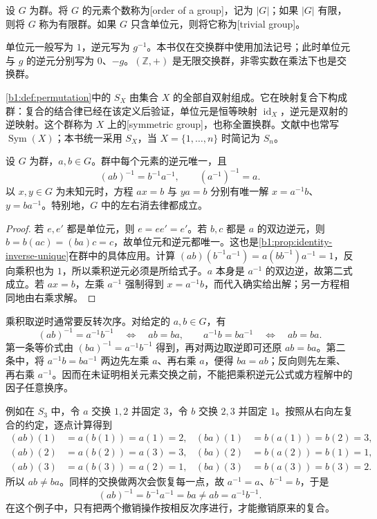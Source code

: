\ProseParagraphBreak
设 \(G\) 为群。将 \(G\) 的元素个数称为[order of a group]，记为 \(\lvert G\rvert\)；如果 \(|G|\) 有限，则将 \(G\) 称为有限群。如果 \(G\) 只含单位元，则将它称为[trivial group]。

\ProseParagraphBreak
单位元一般写为 \(1\)，逆元写为 \(g^{-1}\)。本书仅在交换群中使用加法记号；此时单位元与 \(g\) 的逆元分别写为 \(0\)、\(-g\)。\((\mathbb Z,+)\) 是无限交换群，非零实数在乘法下也是交换群。

\ProseParagraphBreak
\cref{b1:def:permutation}中的 \(S_X\) 由集合 \(X\) 的全部自双射组成。它在映射复合下构成群：复合的结合律已经在该定义后验证，单位元是恒等映射 \(\operatorname{id}_X\)，逆元是双射的逆映射。这个群称为 \(X\) 上的[symmetric group]，也称全置换群。文献中也常写 \(\operatorname{Sym}(X)\)；本书统一采用 \(S_X\)，当 \(X=\{1,\ldots,n\}\) 时简记为 \(S_n\)。

\begin{proposition}\label{b1:prop:group-identities}
	设 \(G\) 为群，\(a,b\in G\)。群中每个元素的逆元唯一，且
	\[
		(ab)^{-1}=b^{-1}a^{-1},\qquad (a^{-1})^{-1}=a.
	\]
	以 \(x,y\in G\) 为未知元时，方程 \(ax=b\) 与 \(ya=b\) 分别有唯一解 \(x=a^{-1}b\)、\(y=ba^{-1}\)。特别地，\(G\) 中的左右消去律都成立。
\end{proposition}

\begin{proof}
	若 \(e,e'\) 都是单位元，则 \(e=ee'=e'\)。若 \(b,c\) 都是 \(a\) 的双边逆元，则 \(b=b(ac)=(ba)c=c\)，故单位元和逆元都唯一。这也是\cref{b1:prop:identity-inverse-unique}在群中的具体应用。计算 \((ab)(b^{-1}a^{-1})=a(bb^{-1})a^{-1}=1\)，反向乘积也为 \(1\)，所以乘积逆元必须是所给式子。\(a\) 本身是 \(a^{-1}\) 的双边逆，故第二式成立。若 \(ax=b\)，左乘 \(a^{-1}\) 强制得到 \(x=a^{-1}b\)，而代入确实给出解；另一方程相同地由右乘求解。
\end{proof}

乘积取逆时通常要反转次序。对给定的 \(a,b\in G\)，有
\[
	(ab)^{-1}=a^{-1}b^{-1}\quad\Longleftrightarrow\quad ab=ba, \qquad a^{-1}b=ba^{-1}\quad\Longleftrightarrow\quad ab=ba.
\]
第一条等价式由 \((ba)^{-1}=a^{-1}b^{-1}\) 得到，再对两边取逆即可还原 \(ab=ba\)。第二条中，将 \(a^{-1}b=ba^{-1}\) 两边先左乘 \(a\)、再右乘 \(a\)，便得 \(ba=ab\)；反向则先左乘、再右乘 \(a^{-1}\)。因而在未证明相关元素交换之前，不能把乘积逆元公式或方程解中的因子任意换序。

\ProseParagraphBreak
例如在 \(S_3\) 中，令 \(a\) 交换 \(1,2\) 并固定 \(3\)，令 \(b\) 交换 \(2,3\) 并固定 \(1\)。按照从右向左复合的约定，逐点计算得到
\[
	\begin{aligned}
		(ab)(1)&=a(b(1))=a(1)=2,& (ba)(1)&=b(a(1))=b(2)=3,\\
		(ab)(2)&=a(b(2))=a(3)=3,& (ba)(2)&=b(a(2))=b(1)=1,\\
		(ab)(3)&=a(b(3))=a(2)=1,& (ba)(3)&=b(a(3))=b(3)=2.
	\end{aligned}
\]
所以 \(ab\ne ba\)。同样的交换做两次会恢复每一点，故 \(a^{-1}=a\)、\(b^{-1}=b\)，于是
\[
	(ab)^{-1}=b^{-1}a^{-1}=ba\ne ab=a^{-1}b^{-1}.
\]
在这个例子中，只有把两个撤销操作按相反次序进行，才能撤销原来的复合。

